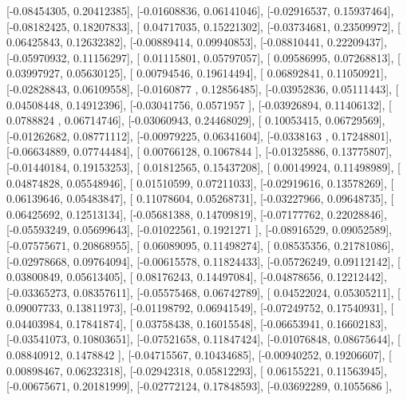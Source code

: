 \documentclass{article}
\begin{document}
       [-0.08454305,  0.20412385],
       [-0.01608836,  0.06141046],
       [-0.02916537,  0.15937464],
       [-0.08182425,  0.18207833],
       [ 0.04717035,  0.15221302],
       [-0.03734681,  0.23509972],
       [ 0.06425843,  0.12632382],
       [-0.00889414,  0.09940853],
       [-0.08810441,  0.22209437],
       [-0.05970932,  0.11156297],
       [ 0.01115801,  0.05797057],
       [ 0.09586995,  0.07268813],
       [ 0.03997927,  0.05630125],
       [ 0.00794546,  0.19614494],
       [ 0.06892841,  0.11050921],
       [-0.02828843,  0.06109558],
       [-0.0160877 ,  0.12856485],
       [-0.03952836,  0.05111443],
       [ 0.04508448,  0.14912396],
       [-0.03041756,  0.0571957 ],
       [-0.03926894,  0.11406132],
       [ 0.0788824 ,  0.06714746],
       [-0.03060943,  0.24468029],
       [ 0.10053415,  0.06729569],
       [-0.01262682,  0.08771112],
       [-0.00979225,  0.06341604],
       [-0.0338163 ,  0.17248801],
       [-0.06634889,  0.07744484],
       [ 0.00766128,  0.1067844 ],
       [-0.01325886,  0.13775807],
       [-0.01440184,  0.19153253],
       [ 0.01812565,  0.15437208],
       [ 0.00149924,  0.11498989],
       [ 0.04874828,  0.05548946],
       [ 0.01510599,  0.07211033],
       [-0.02919616,  0.13578269],
       [ 0.06139646,  0.05483847],
       [ 0.11078604,  0.05268731],
       [-0.03227966,  0.09648735],
       [ 0.06425692,  0.12513134],
       [-0.05681388,  0.14709819],
       [-0.07177762,  0.22028846],
       [-0.05593249,  0.05699643],
       [-0.01022561,  0.1921271 ],
       [-0.08916529,  0.09052589],
       [-0.07575671,  0.20868955],
       [ 0.06089095,  0.11498274],
       [ 0.08535356,  0.21781086],
       [-0.02978668,  0.09764094],
       [-0.00615578,  0.11824433],
       [-0.05726249,  0.09112142],
       [ 0.03800849,  0.05613405],
       [ 0.08176243,  0.14497084],
       [-0.04878656,  0.12212442],
       [-0.03365273,  0.08357611],
       [-0.05575468,  0.06742789],
       [ 0.04522024,  0.05305211],
       [ 0.09007733,  0.13811973],
       [-0.01198792,  0.06941549],
       [-0.07249752,  0.17540931],
       [ 0.04403984,  0.17841874],
       [ 0.03758438,  0.16015548],
       [-0.06653941,  0.16602183],
       [-0.03541073,  0.10803651],
       [-0.07521658,  0.11847424],
       [-0.01076848,  0.08675644],
       [ 0.08840912,  0.1478842 ],
       [-0.04715567,  0.10434685],
       [-0.00940252,  0.19206607],
       [ 0.00898467,  0.06232318],
       [-0.02942318,  0.05812293],
       [ 0.06155221,  0.11563945],
       [-0.00675671,  0.20181999],
       [-0.02772124,  0.17848593],
       [-0.03692289,  0.1055686 ],
\end{document}
